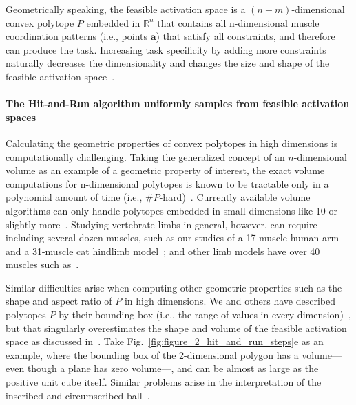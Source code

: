 \documentclass[9pt,twocolumn,twoside,lineno]{pnas-new}
\begin{document}
{Geometrically speaking, the feasible activation space is a $(n-m)$-dimensional convex polytope $P$ embedded in $\mathbb{R}^n$ that contains all n-dimensional muscle coordination patterns (i.e., points $\textbf{a}$) that satisfy all constraints, and therefore can produce the task. Increasing task specificity by adding more constraints naturally decreases the dimensionality and changes the size and shape of the feasible activation space~\cite{Kuo1993Human,sohn2013cat_bounding_box,inouye2016muscle}.


\paragraph*{The Hit-and-Run algorithm uniformly samples from feasible activation spaces}
\label{ss:hitrun}

Calculating the geometric properties of convex polytopes in high dimensions is computationally challenging. Taking the generalized concept of an $n$-dimensional volume as an example of a geometric property of interest, the exact volume computations for n-dimensional polytopes is known to be tractable only in a polynomial amount of time (i.e., $\#P$-hard)~\cite{Dyer}.
Currently available volume algorithms can only handle polytopes embedded in small dimensions like 10 or slightly more~\cite{Bueler2}. Studying vertebrate limbs in general, however, can require including several dozen muscles, such as our studies of a 17-muscle human arm and a 31-muscle cat hindlimb model~\cite{Valero-Cuevas2015high-dimensional}; and other limb models have over 40 muscles such as~\cite{arnold2010model, kutch2012challenges, hamner2010muscle, de2014human}.

Similar difficulties arise when computing other geometric properties such as the shape and aspect ratio of $P$ in high dimensions. We and others have described polytopes $P$ by their bounding box (i.e., the range of values in every dimension)~\cite{sohn2013cat_bounding_box,kutch2011muscle}, but that singularly overestimates the shape and volume of the feasible activation space as discussed in~\cite{Valero-Cuevas2015high-dimensional}.
Take Fig.~\ref{fig:figure_2_hit_and_run_steps}e as an example, where the bounding box of the 2-dimensional polygon has a volume---even though a plane has zero volume---, and can be almost as large as the positive unit cube itself. Similar problems arise in the interpretation of the inscribed and circumscribed ball~\cite{inouye2014optimizing}.

}
\end{document}
